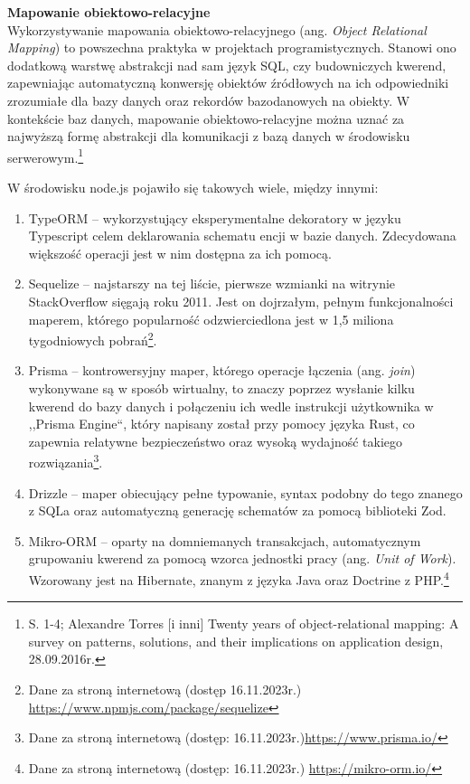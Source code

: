 \documentclass[12pt, a4paper, twoside, openany]{book}
\newcommand{\forceindent}{\leavevmode{\parindent=1.3em\indent}}
\begin{document}
\textbf{Mapowanie obiektowo-relacyjne\\}
\forceindent Wykorzystywanie mapowania obiektowo-relacyjnego (ang. \textit{Object Relational Mapping}) to powszechna praktyka w projektach programistycznych.
Stanowi ono dodatkową warstwę abstrakcji nad sam język SQL, czy budowniczych kwerend, zapewniając automatyczną konwersję obiektów źródłowych na ich odpowiedniki zrozumiałe dla bazy danych oraz rekordów bazodanowych na obiekty.
W kontekście baz danych, mapowanie obiektowo-relacyjne można uznać za najwyższą formę abstrakcji dla komunikacji z bazą danych w środowisku serwerowym.\footnote{S. 1-4; Alexandre Torres [i inni] Twenty years of object-relational mapping: A survey on patterns, solutions, and their implications on application design, 28.09.2016r.}

W środowisku node.js pojawiło się takowych wiele, między innymi:
\begin{enumerate}[label=--]
    \item TypeORM -- wykorzystujący eksperymentalne dekoratory w języku Typescript celem deklarowania schematu encji w bazie danych. Zdecydowana większość operacji jest w nim dostępna za ich pomocą.
    \item Sequelize -- najstarszy na tej liście, pierwsze wzmianki na witrynie StackOverflow sięgają roku 2011. Jest on dojrzałym, pełnym funkcjonalności maperem, którego popularność odzwierciedlona jest w 1,5 miliona tygodniowych pobrań\footnote{Dane za stroną internetową (dostęp 16.11.2023r.) \url{https://www.npmjs.com/package/sequelize}}.
    \item Prisma -- kontrowersyjny maper, którego operacje łączenia (ang. \textit{join}) wykonywane są w sposób wirtualny, to znaczy poprzez wysłanie kilku kwerend do bazy danych i połączeniu ich wedle instrukcji użytkownika w ,,Prisma Engine``, który napisany został przy pomocy języka Rust, co zapewnia relatywne bezpieczeństwo oraz wysoką wydajność takiego rozwiązania\footnote{Dane za stroną internetową (dostęp: 16.11.2023r.)\url{https://www.prisma.io/}}.
    \item Drizzle -- maper obiecujący pełne typowanie, syntax podobny do tego znanego z SQLa oraz automatyczną generację schematów za pomocą biblioteki Zod.
    \item Mikro-ORM -- oparty na domniemanych transakcjach, automatycznym grupowaniu kwerend za pomocą wzorca jednostki pracy (ang. \textit{Unit of Work}). Wzorowany jest na Hibernate, znanym z języka Java oraz Doctrine z PHP.\footnote{Dane za stroną internetową (dostęp: 16.11.2023r.) \url{https://mikro-orm.io/}}
\end{enumerate}
\end{document}
